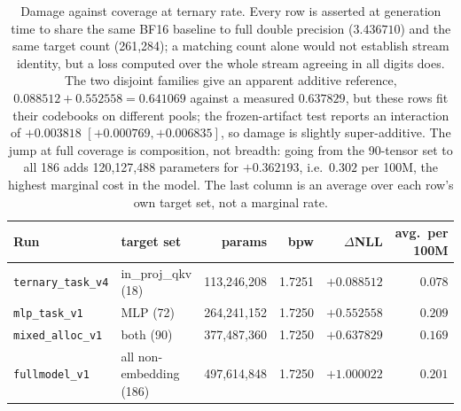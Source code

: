 \begin{table}[t]
\centering
\small
\begin{tabular}{llrrrr}
\toprule
Run & target set & params & bpw & $\Delta$NLL & avg.\ per 100M \\
\midrule
\texttt{ternary\_task\_v4} & in\_proj\_qkv (18) & 113,246,208 & 1.7251 & $+0.088512$ & $0.078$ \\
\texttt{mlp\_task\_v1} & MLP (72) & 264,241,152 & 1.7250 & $+0.552558$ & $0.209$ \\
\texttt{mixed\_alloc\_v1} & both (90) & 377,487,360 & 1.7250 & $+0.637829$ & $0.169$ \\
\texttt{fullmodel\_v1} & all non-embedding (186) & 497,614,848 & 1.7250 & $+1.000022$ & $0.201$ \\
\bottomrule
\end{tabular}
\caption{Damage against coverage at ternary rate. Every row is asserted at generation time to share the same BF16 baseline to full double precision ($3.436710$) and the same target count (261,284); a matching count alone would not establish stream identity, but a loss computed over the whole stream agreeing in all digits does. The two disjoint families give an apparent additive reference, $0.088512 + 0.552558 = 0.641069$ against a measured $0.637829$, but these rows fit their codebooks on different pools; the frozen-artifact test reports an interaction of $+0.003818$ $[+0.000769,+0.006835]$, so damage is slightly super-additive. The jump at full coverage is composition, not breadth: going from the 90-tensor set to all 186 adds 120,127,488 parameters for $+0.362193$, i.e.\ $0.302$ per 100M, the highest marginal cost in the model. The last column is an average over each row's own target set, not a marginal rate.}
\label{tab:additivity}
\end{table}
